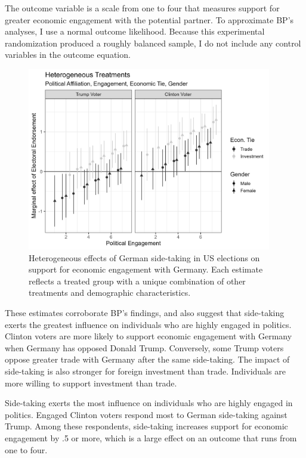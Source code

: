 \documentclass[12pt]{article}
\begin{document}
The outcome variable is a scale from one to four that measures support for greater economic engagement with the potential partner. 
To approximate BP's analyses, I use a normal outcome likelihood. 
Because this experimental randomization produced a roughly balanced sample, I do not include any control variables in the outcome equation. 


\begin{figure}[htpb]
	\centering
		\includegraphics[width=0.95\textwidth]{bp-het-est.png}
	\caption{Heterogeneous effects of German side-taking in US elections on support for economic engagement with Germany. Each estimate reflects a treated group with a unique combination of other treatments and demographic characteristics.}
	\label{fig:bp-het-est}
\end{figure}


These estimates corroborate BP's findings, and also suggest that side-taking exerts the greatest influence on individuals who are highly engaged in politics. 
Clinton voters are more likely to support economic engagement with Germany when Germany has opposed Donald Trump. 
Conversely, some Trump voters oppose greater trade with Germany after the same side-taking. 
The impact of side-taking is also stronger for foreign investment than trade. 
Individuals are more willing to support investment than trade.


Side-taking exerts the most influence on individuals who are highly engaged in politics. 
Engaged Clinton voters respond most to German side-taking against Trump. 
Among these respondents, side-taking increases support for economic engagement by .5 or more, which is a large effect on an outcome that runs from one to four. 




\newpage
\singlespace
 
 
\end{document}
